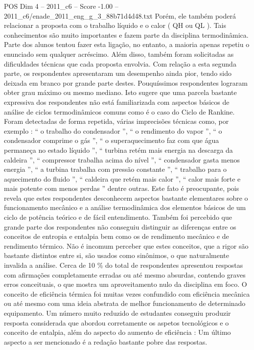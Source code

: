 \begin{textsample}{POS Dim 4 – 2011\_c6 – Score -1.00 – 2011\_c6/enade\_2011\_eng\_g\_3\_88b71d4d48.txt}
Porém, ele também poderá relacionar a proposta com o trabalho líquido e o calor ( QH ou QL ).
Tais conhecimentos são muito importantes e fazem parte da disciplina termodinâmica.
Parte dos alunos tentou fazer esta ligação, no entanto, a maioria apenas repetiu o enunciado sem qualquer acréscimo.
Além disso, também foram solicitadas as dificuldades técnicas que cada proposta envolvia.
Com relação a esta segunda parte, os respondentes apresentaram um desempenho ainda pior, tendo sido deixada em branco por grande parte destes.
Pouquíssimos respondentes lograram obter grau máximo ou mesmo mediano.
Isto sugere que uma parcela bastante expressiva dos respondentes não está familiarizada com aspectos básicos de análise de ciclos termodinâmicos comuns como é o caso do Ciclo de Rankine.
Foram detectadas de forma repetida, várias imprecisões técnicas como, por exemplo : “ o trabalho do condensador ”, “ o rendimento do vapor ”, “ o condensador comprime o gás ”, “ o superaquecimento faz com que água permaneça no estado líquido ”, “ turbina retém mais energia na descarga da caldeira ”, “ compressor trabalha acima do nível ”, “ condensador gasta menos energia ”, “ a turbina trabalha com pressão constante ”, “ trabalho para o aquecimento do fluido ”, “ caldeira que retém mais calor ”, “ calor mais forte e mais potente com menos perdas ” dentre outras.
Este fato é preocupante, pois revela que estes respondentes desconhecem aspectos bastante elementares sobre o funcionamento mecânico e a análise termodinâmica dos elementos básicos de um ciclo de potência teórico e de fácil entendimento.
Também foi percebido que grande parte dos respondentes não conseguiu distinguir as diferenças entre os conceitos de entropia e entalpia bem como os de rendimento mecânico e de rendimento térmico.
Não é incomum perceber que estes conceitos, que a rigor são bastante distintos entre si, são usados como sinônimos, o que naturalmente invalida a análise.
Cerca de 10 \% do total de respondentes apresentou respostas com afirmações completamente erradas ou até mesmo absurdas, contendo graves erros conceituais, o que mostra um aproveitamento nulo da disciplina em foco.
O conceito de eficiência térmica foi muitas vezes confundido com eficiência mecânica ou até mesmo com uma ideia abstrata de melhor funcionamento de determinado equipamento.
Um número muito reduzido de estudantes conseguiu produzir resposta considerada que abordou corretamente os aspetos tecnológicos e o conceito de entalpia, além do aspecto do aumento de eficiência : Um último aspecto a ser mencionado é a redação bastante pobre das respostas.

\end{textsample}

